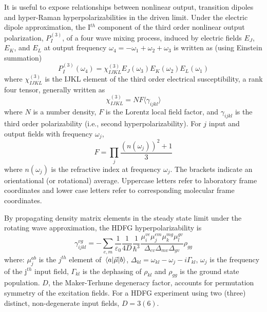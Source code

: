 \documentclass[aip, jcp, reprint, onecolumn]{revtex4-2}
\begin{document}
It is useful to expose relationships between nonlinear output, transition dipoles and hyper-Raman hyperpolarizabilities in the driven limit. \cite{Simpson2004}
Under the electric dipole approximation, the I$^{th}$ component of the third order nonlinear output polarization, ${P}^{(3)}_I$, of a four wave mixing process, induced by electric fields $E_J$, $E_K$, and $E_L$ at output frequency $\omega_4=-\omega_1 + \omega_2 + \omega_3$ is written as (using Einstein summation) \cite{RN307}
\begin{equation} \label{polarization}
{P}^{(3)}_I (\omega_4)  = \chi^{(3)}_{IJKL} E_J(\omega_3) E_K(\omega_2) E_L(\omega_1) 
\end{equation}
where $\chi^{(3)}_{IJKL}$ is the IJKL element of the third order electrical susceptibility, a rank four tensor, generally written as
\begin{equation}
	\chi^{(3)}_{IJKL} = NF \langle \gamma_{ijkl} \rangle
\end{equation}
where $N$ is a number density, $F$ is the Lorentz local field factor, and $\gamma_{ijkl}$ is the third order polarizability (i.e., second hyperpolarizability). 
For $j$ input and output fields with frequency $\omega_j$, 
\begin{equation}
	F = \prod_j \frac{\left(n(\omega_j)\right)^2 + 1}{3}
\end{equation}
where $n(\omega_j)$ is the refractive index at frequency $\omega_j$.\cite{Bedeaux1973}
The brackets indicate an orientational (or rotational) average.\cite{Andrews1977}
Uppercase letters refer to laboratory frame coordinates and lower case letters refer to corresponding molecular frame coordinates.

By propagating density matrix elements in the steady state limit under the rotating wave approximation, the HDFG hyperpolarizability is \cite{RN133}
\begin{equation}\label{sivegamma}
		\gamma_{ijkl}^{vg} =	- \sum_{e,m} \frac{1}{\varepsilon_0} \frac{1}{4D} \frac{1}{\hbar^3} \frac{\mu^{ve}_{i} \mu^{em}_{j} \mu^{mg}_{k} \mu^{gv}_{l} }{\Delta_{ev} \Delta_{mv}\Delta_{gv}}  \rho_{gg}
\end{equation}
where: $\mu^{ab}_{j}$ is the $j^{th}$ element of $\mel{a}{\vec{\mu}}{b}$, $\Delta_{kl} = \omega_{kl} - \omega_{j} - i\Gamma_{kl}$, $\omega_j$ is the frequency of the j$^{th}$ input field, $\Gamma_{kl}$ is the dephasing of $\rho_{kl}$ and $\rho_{gg}$ is the ground state population.
$D$, the Maker-Terhune degeneracy factor, accounts for permutation symmetry of the excitation fields.\cite{RN134} 
For a HDFG experiment using two (three) distinct, non-degenerate input fields, $D = 3 (6)$.
\end{document}
